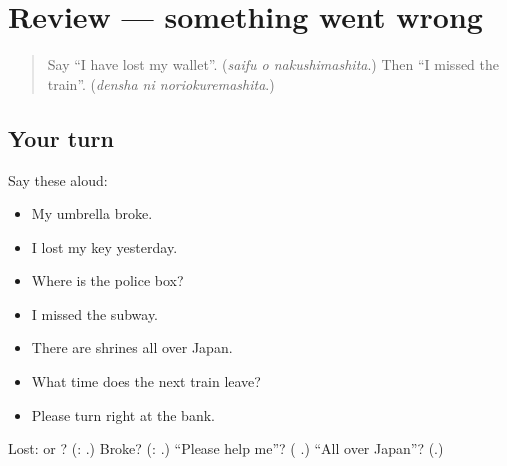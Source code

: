 \section[(review)]{Review — something went wrong}

\label{lesson:JA-R257-something-went-wrong}



\begin{quote}
Say \textquotedblleft{}I have lost my wallet\textquotedblright{}. (\emph{saifu o nakushimashita}.) Then \textquotedblleft{}I missed the train\textquotedblright{}. (\emph{densha ni noriokuremashita}.)
\end{quote}

\subsection*{Your turn}
Say these aloud:

\begin{itemize}
\raggedright
  \item My umbrella broke.
  \item I lost my key yesterday.
  \item Where is the police box?
  \item I missed the subway.
  \item There are shrines all over Japan.
  \item What time does the next train leave?
  \item Please turn right at the bank.
\end{itemize}

\begin{tcolorbox}[breakable,colback=teal!4,colframe=teal!35!black,title={Before you move on}]
Lost: \textbf{} or \textbf{}? (\textbf{}: \textbf{ }.) Broke? (\textbf{}: \textbf{ }.) \textquotedblleft{}Please help me\textquotedblright{}? (\textbf{ }.) \textquotedblleft{}All over Japan\textquotedblright{}? (\textbf{}.)
\end{tcolorbox}
